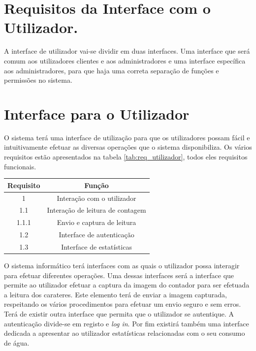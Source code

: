 \section{Requisitos da Interface com o Utilizador.} \label{sec:req_ut}
A interface de utilizador vai-se dividir em duas interfaces. Uma interface que será comum aos utilizadores clientes e aos administradores e uma interface específica aos administradores, para que haja uma correta separação de funções e permissões no sistema. 

\section{Interface para o Utilizador} \label{sec:req_ut2}
O sistema terá uma interface de utilização para que os utilizadores possam fácil e intuitivamente efetuar as diversas operações que o sistema disponibiliza. Os vários requisitos estão apresentados na tabela \ref{tab:req_utilizador}, todos eles requisitos funcionais.

\begin{center}
\begin{tabular}[c]{c  c }  %
\hline
Requisito & Função\\
\hline
1 & Interação com o utilizador\\ 

1.1 & Interação de leitura de contagem\\

1.1.1 & Envio e captura de leitura\\

1.2 & Interface de autenticação\\

1.3 & Interface de estatísticas\\
\hline
\end{tabular}
\label{tab:req_utilizador}
\end{center}
\vspace{8mm} %

O sistema informático terá interfaces com as quais o utilizador possa interagir para efetuar diferentes operações. Uma dessas interfaces será a interface que permite ao utilizador efetuar a captura da imagem do contador para ser efetuada a leitura dos carateres. Este elemento terá de enviar a imagem capturada, respeitando os vários procedimentos para efetuar um envio seguro e sem erros.\\
Terá de existir outra interface que permita que o utilizador se autentique. A autenticação divide-se em registo e {\textit{log in}}. Por fim existirá também uma interface dedicada a apresentar ao utilizador estatísticas relacionadas com o seu consumo de água.



